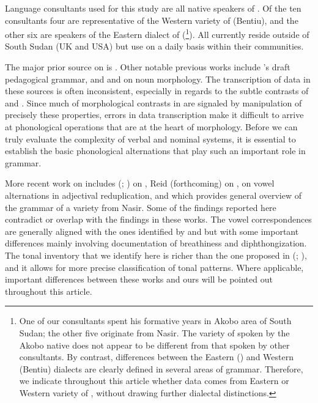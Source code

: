 \documentclass[output=paper
,newtxmath
,modfonts
,nonflat]{langsci/langscibook}
\begin{document}
Language consultants used for this study are all native speakers of .  Of the ten consultants four are representative of the Western variety of  (Bentiu), and the other six are speakers of the Eastern dialect of  (\footnote{One of our   consultants spent his formative years in Akobo area of South Sudan; the other five  originate from Nasir.  The variety of  spoken by the Akobo native does not appear to be different from that spoken by other   consultants.  By contrast, differences between the Eastern () and Western (Bentiu) dialects are clearly defined in several areas of grammar.  Therefore, we indicate throughout this article whether data comes from Eastern or Western variety of , without drawing further dialectal distinctions.}).  All currently reside outside of South Sudan (UK and USA) but use  on a daily basis within their communities.  

The major prior source on  is \citet{Crazzolara1933}. Other notable previous works include \citet{Vandevortnd}'s draft pedagogical grammar, and \citet{Frank1999} and \citet{Storch2005} on noun morphology.  The transcription of data in these sources is often inconsistent, especially in regards to the subtle contrasts of  and .  Since much of morphological contrasts in  are signaled by manipulation of precisely these properties, errors in data transcription make it difficult to arrive at phonological operations that are at the heart of  morphology.  Before we can truly evaluate the complexity of  verbal and nominal systems, it is essential to establish the basic phonological alternations that play such an important role in  grammar.

More recent work on  includes
\citeauthor{gjersøe2016} (\citeyear{gjersøe2016}; \citeyear{gjersøe2017}) on , Reid (forthcoming) on , \citet{Faust2017} on vowel alternations in adjectival reduplication, and \citet{faust2015} which provides general overview of the grammar of a  variety from Nasir. Some of the findings reported here contradict or overlap with the findings in these works.  The vowel correspondences are generally aligned with the ones identified by \citet{Faust2017} and \citet{faust2015} but with some important differences mainly involving documentation of breathiness and diphthongization.  The tonal inventory that we identify here is richer than the one proposed in \citeauthor{gjersøe2016} (\citeyear{gjersøe2016}; \citeyear{gjersøe2017}), and it allows for more precise classification of tonal patterns.  Where applicable, important differences between these works and ours will be pointed out throughout this article.
\end{document}
